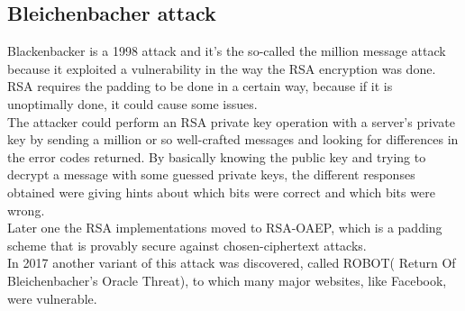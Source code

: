 \subsection{Bleichenbacher attack}
Blackenbacker is a 1998 attack and it's the so-called the million
message attack because it exploited a vulnerability in the way the RSA
encryption was done. RSA requires the padding to be done in a certain
way, because if it is unoptimally done, it could cause some issues.\\
The attacker could perform an RSA private key operation with a
server’s private key by sending a million or so well-crafted messages
and looking for differences in the error codes returned. By basically
knowing the public key and trying to decrypt a message with some
guessed private keys, the different responses obtained were giving
hints about which bits were correct and which bits were wrong.\\
Later one the RSA implementations moved to RSA-OAEP, which is a
padding scheme that is provably secure against chosen-ciphertext
attacks.\\
In 2017 another variant of this attack was discovered, called
ROBOT( Return Of Bleichenbacher's Oracle Threat), to which many major
websites, like Facebook, were vulnerable.

